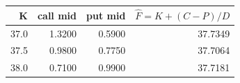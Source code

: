 \begin{center}\small
\begin{tabular}{|r|r|r|r|}
\hline
K & call mid & put mid & $\hat F=K+(C-P)/D$ \\ \hline
37.0 & 1.3200 & 0.5900 & 37.7349 \\
37.5 & 0.9800 & 0.7750 & 37.7064 \\
38.0 & 0.7100 & 0.9900 & 37.7181 \\
\hline
\end{tabular}
\end{center}
